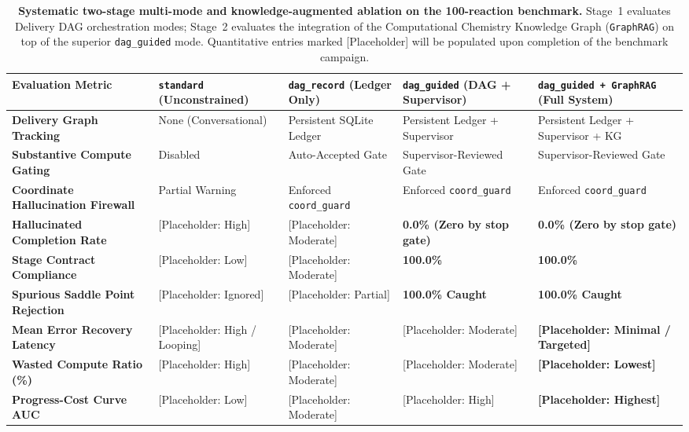 \documentclass[10pt,twocolumn,letterpaper]{article}
\begin{document}
\begin{table}[t]
\centering
\small
\caption{\textbf{Systematic two-stage multi-mode and knowledge-augmented ablation on the 100-reaction benchmark.} Stage~1 evaluates Delivery DAG orchestration modes; Stage~2 evaluates the integration of the Computational Chemistry Knowledge Graph (\texttt{GraphRAG}) on top of the superior \texttt{dag\_guided} mode. Quantitative entries marked [Placeholder] will be populated upon completion of the benchmark campaign.}
\label{tab:ablation}
\begin{tabularx}{\textwidth}{lXXXX}
\toprule
\textbf{Evaluation Metric} & \textbf{\texttt{standard} (Unconstrained)} & \textbf{\texttt{dag\_record} (Ledger Only)} & \textbf{\texttt{dag\_guided} (DAG + Supervisor)} & \textbf{\texttt{dag\_guided + GraphRAG} (Full System)} \\
\midrule
\textbf{Delivery Graph Tracking} & None (Conversational) & Persistent SQLite Ledger & Persistent Ledger + Supervisor & Persistent Ledger + Supervisor + KG \\
\textbf{Substantive Compute Gating} & Disabled & Auto-Accepted Gate & Supervisor-Reviewed Gate & Supervisor-Reviewed Gate \\
\textbf{Coordinate Hallucination Firewall} & Partial Warning & Enforced \texttt{coord\_guard} & Enforced \texttt{coord\_guard} & Enforced \texttt{coord\_guard} \\
\textbf{Hallucinated Completion Rate} & [Placeholder: High] & [Placeholder: Moderate] & \textbf{0.0\% (Zero by stop gate)} & \textbf{0.0\% (Zero by stop gate)} \\
\textbf{Stage Contract Compliance} & [Placeholder: Low] & [Placeholder: Moderate] & \textbf{100.0\%} & \textbf{100.0\%} \\
\textbf{Spurious Saddle Point Rejection} & [Placeholder: Ignored] & [Placeholder: Partial] & \textbf{100.0\% Caught} & \textbf{100.0\% Caught} \\
\textbf{Mean Error Recovery Latency} & [Placeholder: High / Looping] & [Placeholder: Moderate] & [Placeholder: Moderate] & \textbf{[Placeholder: Minimal / Targeted]} \\
\textbf{Wasted Compute Ratio (\%)} & [Placeholder: High] & [Placeholder: Moderate] & [Placeholder: Moderate] & \textbf{[Placeholder: Lowest]} \\
\textbf{Progress-Cost Curve AUC} & [Placeholder: Low] & [Placeholder: Moderate] & [Placeholder: High] & \textbf{[Placeholder: Highest]} \\
\bottomrule
\end{tabularx}
\end{table}
\end{document}
